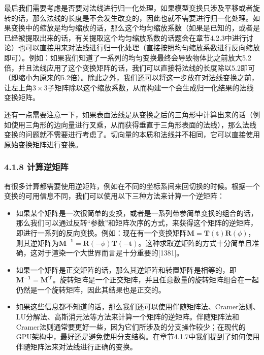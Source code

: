 \documentclass[
  paper=a4,
  ,captions=tableheading
]{scrartcl}
\providecommand{\tightlist}{%
  \setlength{\itemsep}{0pt}\setlength{\parskip}{0pt}}
\begin{document}
最后我们需要考虑是否要对法线进行归一化处理，如果模型变换只涉及平移或者旋转的话，那么法线的长度是不会发生改变的，因此也就不需要进行归一化处理。如果变换中的缩放是均匀缩放的话，那么这个均匀缩放系数（如果是已知的，或者是已经被提取出来的话，有关提取这个均匀缩放系数的话题会在章节4.2.3中进行讨论）也可以直接用来对法线进行归一化处理（直接按照均匀缩放系数进行反向缩放即可）。例如：如果我们知道了一系列的均匀变换最终会导致物体比之前放大5.2倍，并且法线应用了这个变换矩阵的话，我们可以直接将法线的长度除以5.2即可（即缩小为原来的5.2倍）。除此之外，我们还可以将这一步放在对法线变换之前，让左上角\(3 \times 3\)子矩阵除以这个缩放系数，从而构建一个会生成归一化结果的法线变换矩阵。

还有一点需要注意一下，如果表面法线是从变换之后的三角形中计算出来的话（例如使用三角形的边向量进行叉乘，从而获得垂直于三角形表面的法线），那么法线变换的问题就不需要进行考虑了。切向量的本质和法线并不相同，它可以直接使用原始变换矩阵进行变换。

\subsubsection{4.1.8 计算逆矩阵}\label{ux8ba1ux7b97ux9006ux77e9ux9635}

有很多计算都需要使用逆矩阵，例如在不同的坐标系间来回切换的时候。根据一个变换的可用信息不同，我们可以使用以下三种方法来计算一个逆矩阵：

\begin{itemize}
  \tightlist
  \item
        如果某个矩阵是一次很简单的变换，或者是一系列带参简单变换的组合的话，那么我们可以通过反转``参数''和矩阵次序的方式，来获得这个矩阵的逆矩阵，即进行一系列的反向变换。例如：现在有一个变换矩阵\(\mathbf{M}=\mathbf{T(t)}\mathbf{R}(\phi)\)，则其逆矩阵为\(\mathbf{M^{-1}} = \mathbf{R}(-\phi)\mathbf{T(-t)}\)。这种求取逆矩阵的方式十分简单且准确，这对于渲染一个大世界而言是十分重要的{[}1381{]}。
  \item
        如果一个矩阵是正交矩阵的话，那么其逆矩阵和转置矩阵是相等的，即\(\mathbf{M^{-1}} = \mathbf{M^{T}}\)。旋转矩阵是一个正交矩阵，并且任意数量的旋转矩阵组合在一起仍然是一个旋转矩阵，因此其结果也是正交的。
  \item
        如果这些信息都不知道的话，那么我们还可以使用伴随矩阵法、Cramer法则、LU分解法、高斯消元法等方法来计算一个矩阵的逆矩阵。伴随矩阵法和Cramer法则通常要更好一些，因为它们所涉及的分支操作较少；在现代的GPU架构中，最好还是避免使用分支结构。在章节4.1.7中我们提到了如何使用伴随矩阵法来对法线进行正确的变换。
\end{itemize}
\end{document}
